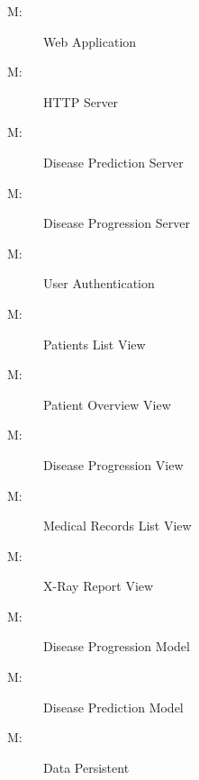 \documentclass[12pt, titlepage]{article}
\newcounter{mnum}
\newcommand{\mthemnum}{M\themnum}
\begin{document}
\begin{description}
\item [ \mthemnum \label{mWebApp}:] Web Application 
\item [ \mthemnum \label{mHTTP}:] HTTP Server 
\item [ \mthemnum \label{mDiseasePredict}:] Disease Prediction Server 
\item [ \mthemnum \label{mDiseaseProgress}:] Disease Progression Server
\item [ \mthemnum \label{mAuth}:] User Authentication 
\item [ \mthemnum \label{mPatientList}:] Patients List View 
\item [ \mthemnum \label{mPatientOverview}:] Patient Overview View 
\item [ \mthemnum \label{mProgressView}:] Disease Progression View 
\item [ \mthemnum \label{mRecordsList}:] Medical Records List View
\item [ \mthemnum \label{mReportView}:] X-Ray Report View
\item [ \mthemnum \label{mProgressModel}:] Disease Progression Model 
\item [ \mthemnum \label{mPredictModel}:] Disease Prediction Model
\item [ \mthemnum \label{mDataStore}:] Data Persistent 
\end{description}
\end{document}
